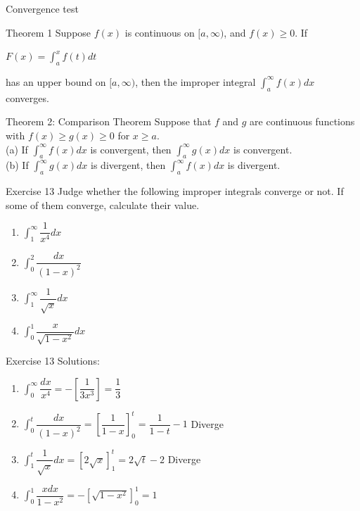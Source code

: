 \begin{frame}{Convergence test}
    \begin{block}{Theorem 1}
        Suppose $f(x)$ is continuous on $[a, \infty)$, and $f(x) \geq 0$. If
        \begin{center}
            $F(x)=\int_{a}^{x}f(t)dt$
        \end{center}
        has an upper bound on $[a, \infty)$, then the improper integral $\int_{a}^{\infty}f(x)dx$ converges.
    \end{block}
    \begin{block}{Theorem 2: Comparison Theorem}
        Suppose that $f$ and $g$ are continuous functions with $f(x) \geqslant g(x) \geqslant 0$ for $x \geqslant a$.\\
        (a) If $\int_{a}^{\infty} f(x) d x$ is convergent, then $\int_{a}^{\infty} g(x) d x$ is convergent.\\
        (b) If $\int_{a}^{\infty} g(x) d x$ is divergent, then $\int_{a}^{\infty} f(x) d x$ is divergent.
    \end{block}
\end{frame}




\begin{frame}{Exercise 13}
    Judge whether the following improper integrals converge or not. If some of them converge, calculate their value.
    \begin{enumerate}
        \item $\int_{1}^{\infty}\dfrac{1}{x^{4}}dx$
        \item $\int_{0}^{2}\dfrac{dx}{(1-x)^{2}}$
        \item $\int_{1}^{\infty}\dfrac{1}{\sqrt{x}}dx$
        \item $\int_{0}^{1} \dfrac{x}{\sqrt{1-x^{2}}}dx$
    \end{enumerate}
\end{frame}

\begin{frame}{Exercise 13}
    Solutions:

    \begin{enumerate}
        \item $\int_0^{\infty} \dfrac{dx}{x^4} = -\left[\dfrac{1}{3x^3}\right] = \dfrac{1}{3}$

        \item $\int_{0}^t \dfrac{dx}{(1-x)^2} = \left[\dfrac{1}{1-x}\right]_0^t = \dfrac{1}{1-t} - 1$ Diverge

        \item $\int_1^t \dfrac{1}{\sqrt{x}}dx = [2\sqrt{x}]_1^t = 2\sqrt{t} - 2$ Diverge

        \item $\int_0^1 \dfrac{xdx}{1-x^2} = -[\sqrt{1-x^2}]_0^1 = 1$
    \end{enumerate}
\end{frame}

